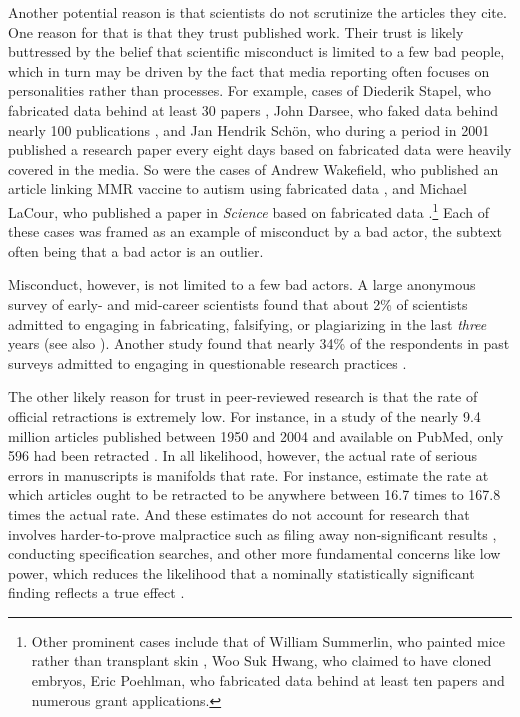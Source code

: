\documentclass[11pt,letterpaper]{article}
\begin{document}
Another potential reason is that scientists do not scrutinize the articles they cite. One reason for that is that they trust published work. Their trust is likely buttressed by the belief that scientific misconduct is limited to a few bad people, which in turn may be driven by the fact that media reporting often focuses on personalities rather than processes. For example, cases of Diederik Stapel, who fabricated data behind at least 30 papers \citep{levelt2012flawed}, John Darsee, who faked data behind nearly 100 publications \citep{stewart1987integrity, anderson2013research, wallis1983fraud}, and Jan Hendrik Sch{\"o}n, who during a period in 2001 published a research paper every eight days based on fabricated data \citep{service2003scientific, anderson2013research} were heavily covered in the media. So were the cases of Andrew Wakefield, who published an article linking MMR vaccine to autism using fabricated data \citep{wakefield1998retracted, deer2011case, godlee2011wakefield}, and Michael LaCour, who published a paper in \textit{Science} based on fabricated data \citep{broockman2015irregularities, mcnutt2015editorial}.\footnote{Other prominent cases include that of William Summerlin, who painted mice rather than transplant skin \citep{basu2006they, anderson2013research}, Woo Suk Hwang, who claimed to have cloned embryos, Eric Poehlman, who fabricated data behind at least ten papers and numerous grant applications.} Each of these cases was framed as an example of misconduct by a bad actor, the subtext often being that a bad actor is an outlier.

Misconduct, however, is not limited to a few bad actors. A large anonymous survey of early- and mid-career scientists found that about 2\% of scientists admitted to engaging in fabricating, falsifying, or plagiarizing in the last \textit{three} years \citep{martinson2005scientists} (see also \citet{titus2008repairing}). Another study found that nearly 34\% of the respondents in past surveys admitted to engaging in questionable research practices \citep{fanelli2009many}.

The other likely reason for trust in peer-reviewed research is that the rate of official retractions is extremely low. For instance, in a study of the nearly 9.4 million articles published between 1950 and 2004 and available on PubMed, only 596 had been retracted \citep{cokol2007many}. In all likelihood, however, the actual rate of serious errors in manuscripts is manifolds that rate. For instance, \citet{cokol2007many} estimate the rate at which articles ought to be retracted to be anywhere between 16.7 times to 167.8 times the actual rate. And these estimates do not account for research that involves harder-to-prove malpractice such as filing away non-significant results \citep{franco2014publication}, conducting specification searches, and other more fundamental concerns like low power, which reduces the likelihood that a nominally statistically significant finding reflects a true effect \citep{button2013power, ioannidis2005most}.
\end{document}
